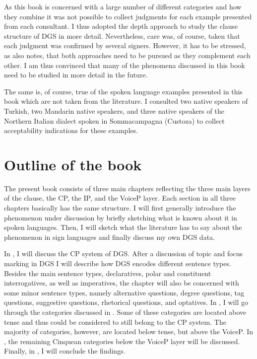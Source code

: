 As this book is concerned with a large number of different categories and how they combine it was not possible to collect judgments for each example presented from each consultant. I thus adopted the depth approach to study the clause structure of DGS in more detail. Nevertheless, care was, of course, taken that each judgment was confirmed by several signers. However, it has to be stressed, as \citet{zyman2012two} also notes, that both approaches need to be pursued as they complement each other. I am thus convinced that many of the phenomena discussed in this book need to be studied in more detail in the future. 

The same is, of course, true of the spoken language examples presented in this book which are not taken from the literature. I consulted two native speakers of Turkish, two Mandarin native speakers, and three native speakers of the Northern Italian dialect spoken in Sommacampagna (Custoza) to collect acceptability indications for these examples.



\section{Outline of the book}\label{outlinesection}
The present book consists of three main chapters reflecting the three main layers of the clause, the CP, the IP, and the VoiceP layer. Each section in all three chapters basically has the same structure. I will first generally introduce the phenomenon under discussion by briefly sketching what is known about it in spoken languages. Then, I will sketch what the literature has to say about the phenomenon in sign languages and finally discuss my own DGS data. 

In , I will discuss the CP system of DGS. After a discussion of topic and focus marking in DGS I will describe how DGS encodes different sentence types. Besides the main sentence types, declaratives, polar and constituent interrogatives, as well as imperatives, the chapter will also be concerned with some minor sentence types, namely alternative questions, degree questions, tag questions, suggestive questions, rhetorical questions, and optatives. In , I will go through the categories discussed in \citet{cinque1999adverbs, cinque2006restructuring}. Some of these categories are located above tense and thus could be considered to still belong to the CP system. The majority of categories, however, are located below tense, but above the VoiceP. In , the remaining Cinquean categories below the VoiceP layer will be discussed. Finally, in , I will conclude the findings.

